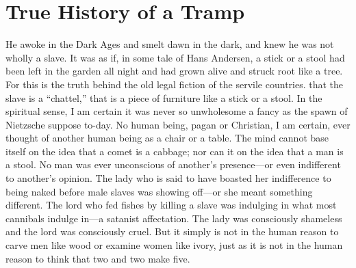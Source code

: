 \documentclass{book}
\begin{document}
\chapter{True History of a Tramp}
\label{chapter-12}
He awoke in the Dark Ages and smelt dawn in the dark, and knew he was not wholly a slave. It was as if, in some tale of Hans Andersen, a stick or a stool had been left in the garden all night and had grown alive and struck root like a tree. For this is the truth behind the old legal fiction of the servile countries. that the slave is a “chattel,” that is a piece of furniture like a stick or a stool. In the spiritual sense, I am certain it was never so unwholesome a fancy as the spawn of Nietzsche suppose to-day. No human being, pagan or Christian, I am certain, ever thought of another human being as a chair or a table. The mind cannot base itself on the idea that a comet is a cabbage; nor can it on the idea that a man is a stool. No man was ever unconscious of another’s presence—or even indifferent to another’s opinion. The lady who is said to have boasted her indifference to being naked before male slaves was showing off—or she meant something different. The lord who fed fishes by killing a slave was indulging in what most cannibals indulge in—a satanist affectation. The lady was consciously shameless and the lord was consciously cruel. But it simply is not in the human reason to carve men like wood or examine women like ivory, just as it is not in the human reason to think that two and two make five.
\end{document}
